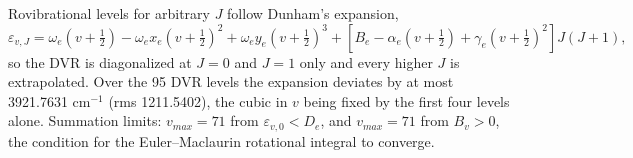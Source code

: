 \documentclass[11pt]{article}
\begin{document}
\vspace{2pt}\noindent Rovibrational levels for arbitrary $J$ follow Dunham's expansion,
\begin{equation*}\varepsilon_{v,J}=\omega_e(v+\tfrac12)-\omega_ex_e(v+\tfrac12)^2+\omega_ey_e(v+\tfrac12)^3+\left[B_e-\alpha_e(v+\tfrac12)+\gamma_e(v+\tfrac12)^2\right]J(J+1),\end{equation*}
\noindent so the DVR is diagonalized at $J=0$ and $J=1$ only and every higher $J$ is extrapolated. Over the 95 DVR levels the expansion deviates by at most 3921.7631 cm$^{-1}$ (rms 1211.5402), the cubic in $v$ being fixed by the first four levels alone. Summation limits: $v_{max}=71$ from $\varepsilon_{v,0}<D_e$, and $v_{max}=71$ from $B_v>0$, the condition for the Euler--Maclaurin rotational integral to converge.\vspace{4pt}
\end{document}
